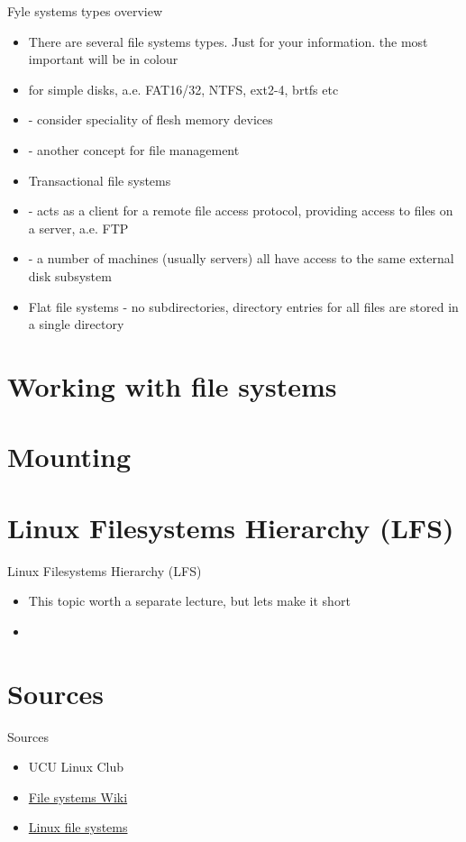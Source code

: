 \documentclass[usenames,dvipsnames,10pt,aspectratio=169]{beamer}
\begin{document}
\begin{frame}{Fyle systems types overview}
    \begin{itemize}
        \item There are several file systems types. Just for your information. the most important will be in  colour
        \item{} for simple disks, a.e. FAT16/32, NTFS, ext2-4, brtfs etc
        \item{} - consider speciality of flesh memory devices
        \item{} - another concept for file management
        \item Transactional file systems
        \item{} - acts as a client for a remote file access protocol, providing access to files on a server, a.e. FTP
        \item{} - a number of machines (usually servers) all have access to the same external disk subsystem
        \item Flat file systems - no subdirectories, directory entries for all files are stored in a single directory
    \end{itemize}
\end{frame}

\section{Working with file systems}

\section{Mounting}

\section{Linux Filesystems Hierarchy (LFS)}

\begin{frame}{Linux Filesystems Hierarchy (LFS)}
    \begin{itemize}
        \item This topic worth a separate lecture, but lets make it short 
        \item 
    \end{itemize}
\end{frame}


\section{Sources}
\begin{frame}{Sources}
    \begin{itemize}
        \item UCU Linux Club
        \item \href{https://en.wikipedia.org/wiki/File_system}{File systems Wiki}
        \item \href{https://www.javatpoint.com/linux-files}{Linux file systems}
    \end{itemize}
\end{frame}
\end{document}
